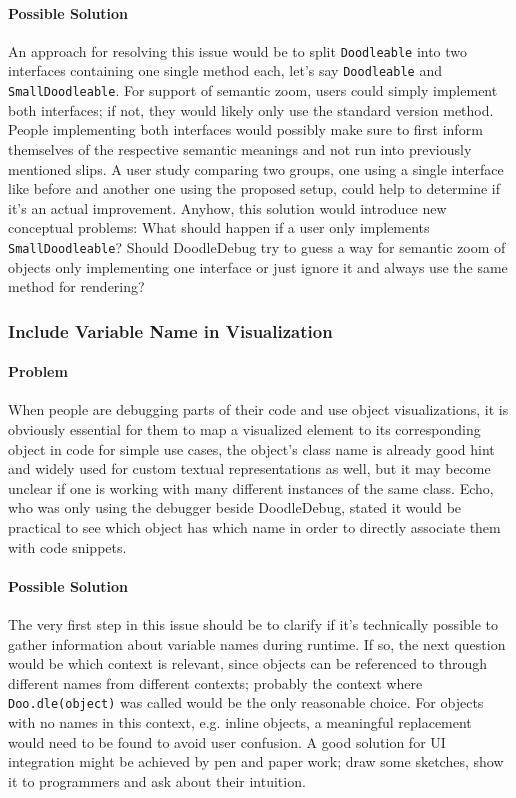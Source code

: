 \documentclass[english]{acm_proc_article-sp}
\begin{document}
\paragraph{Possible Solution}
An approach for resolving this issue would be to split \verb.Doodleable. into two interfaces containing one single method each, let's say \verb.Doodleable. and \verb.SmallDoodleable.. For support of semantic zoom, users could simply implement both interfaces; if not, they would likely only use the standard version method. People implementing both interfaces would possibly make sure to first inform themselves of the respective semantic meanings and not run into previously mentioned slips. A user study comparing two groups, one using a single interface like before and another one using  the proposed setup, could help to determine if it's an actual improvement. Anyhow, this solution would introduce new conceptual problems: What should happen if a user only implements \verb.SmallDoodleable.? Should DoodleDebug try to guess a way for semantic zoom of objects only implementing one interface or just ignore it and always use the same method for rendering?

\subsubsection{Include Variable Name in Visualization}

\paragraph{Problem} When people are debugging parts of their code and use object visualizations, it is obviously essential for them to map a visualized element to its corresponding object in code for simple use cases, the object's class name is already good hint and widely used for custom textual representations as well\cite{Schw11b}, but it may become unclear if one is working with many different instances of the same class. Echo, who was only using the debugger beside DoodleDebug, stated it would be practical to see which object has which name in order to directly associate them with code snippets.

\paragraph{Possible Solution}
The very first step in this issue should be to clarify if it's technically possible to gather information about variable names during runtime. If so, the next question would be which context is relevant, since objects can be referenced to through different names from different contexts; probably the context where \verb-Doo.dle(object)- was called would be the only reasonable choice. For objects with no names in this context, e.g. inline objects, a meaningful replacement would need to be found to avoid user confusion. A good solution for UI integration might be achieved by pen and paper work; draw some sketches, show it to programmers and ask about their intuition.
\end{document}

